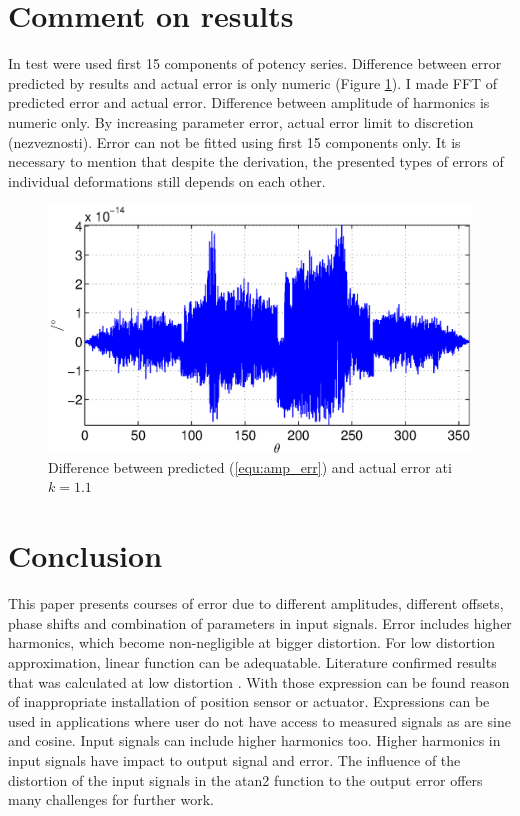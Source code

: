 \documentclass[a4paper]{article}
\begin{document}
\section{Comment on results}

In test were used first 15  components of potency series. Difference between error predicted by results and actual error is only numeric (Figure \ref{fig:razlika}).
I made FFT of predicted error and actual error. Difference between amplitude of harmonics is numeric only. By increasing parameter error, actual error limit to discretion (nezveznosti). Error can not be fitted using first 15 components only. It is necessary to mention that despite the derivation, the presented types of errors of individual deformations still depends on each other.

\begin{figure}[!htb]
	\begin{center}
		\includegraphics[width=\linewidth]{./Slike/razlika_amp.eps}
		\caption{Difference between predicted (\ref{equ:amp_err}) and actual error ati $k=1.1$} \label{fig:razlika}
	\end{center}
\end{figure}

\section{Conclusion}

This paper presents courses of error due to different amplitudes, different offsets, phase shifts and combination of parameters in input signals.
Error includes higher harmonics, which become non-negligible at bigger distortion. For low distortion approximation, linear function can be adequatable.
Literature confirmed results that was calculated at low distortion \cite{RLS1}. With those expression can be found reason of inappropriate installation of position sensor or actuator. Expressions can be used in applications where user do not have access to measured signals as are sine and cosine. Input signals can include higher harmonics too. Higher harmonics in input signals have impact to output signal and error.  The influence of the distortion of the input signals in the atan2 function to the output error offers many challenges for further work. 
\end{document}
